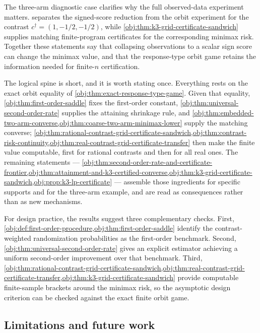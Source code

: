 The three-arm diagnostic case clarifies why the full observed-data experiment matters.  separates the signed-score reduction from the orbit experiment for the contrast \(c^\dagger=(1,-1/2,-1/2)\), while \cref{obj:thm:k3-grid-certificate-sandwich} supplies matching finite-program certificates for the corresponding minimax risk. Together these statements say that collapsing observations to a scalar sign score can change the minimax value, and that the response-type orbit game retains the information needed for finite-\(n\) certification.

The logical spine is short, and it is worth stating once. Everything rests on the exact orbit equality of \cref{obj:thm:exact-response-type-game}. Given that equality, \cref{obj:thm:first-order-saddle} fixes the first-order constant, \cref{obj:thm:universal-second-order-rate} supplies the attaining shrinkage rule, and \cref{obj:thm:embedded-two-arm-converse,obj:thm:coarse-two-arm-minimax-lower} supply the matching converse; \cref{obj:thm:rational-contrast-grid-certificate-sandwich,obj:thm:contrast-risk-continuity,obj:thm:real-contrast-grid-certificate-transfer} then make the finite value computable, first for rational contrasts and then for all real ones. The remaining statements --- \cref{obj:thm:second-order-rate-and-certificate-frontier,obj:thm:attainment-and-k3-certified-converse,obj:thm:k3-grid-certificate-sandwich,obj:prop:k3-lp-certificate} --- assemble those ingredients for specific supports and for the three-arm example, and are read as consequences rather than as new mechanisms.

For design practice, the results suggest three complementary checks. First, \cref{obj:def:first-order-procedure,obj:thm:first-order-saddle} identify the contrast-weighted randomization probabilities as the first-order benchmark. Second, \cref{obj:thm:universal-second-order-rate} gives an explicit estimator achieving a uniform second-order improvement over that benchmark. Third, \cref{obj:thm:rational-contrast-grid-certificate-sandwich,obj:thm:real-contrast-grid-certificate-transfer,obj:thm:k3-grid-certificate-sandwich} provide computable finite-sample brackets around the minimax risk, so the asymptotic design criterion can be checked against the exact finite orbit game.

\subsection{Limitations and future work}

